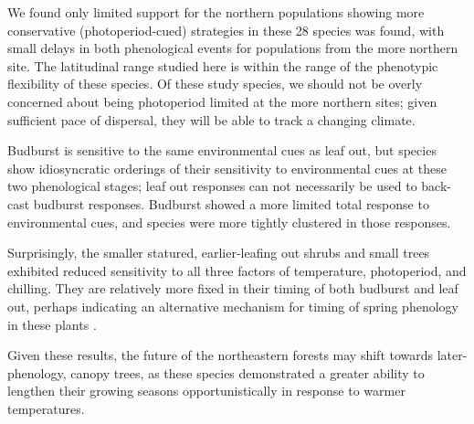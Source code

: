 \documentclass[11pt]{article}
\begin{document}
We found only limited support for the northern populations showing more conservative (photoperiod-cued) strategies in these 28 species was found, with small delays in both phenological events for populations from the more northern site. The latitudinal range studied here is within the range of the phenotypic flexibility of these species. Of these study species, we should not be overly concerned about being photoperiod limited at the more northern sites; given sufficient pace of dispersal, they will be able to track a changing climate.

Budburst is sensitive to the same environmental cues as leaf out, but species show idiosyncratic orderings of their sensitivity to environmental cues at these two phenological stages; leaf out responses can not necessarily be used to back-cast budburst responses. Budburst showed a more limited total response to environmental cues, and species were more tightly clustered in those responses.

Surprisingly, the smaller statured, earlier-leafing out shrubs and small trees exhibited reduced sensitivity to all three factors of temperature, photoperiod, and chilling. They are relatively more fixed in their timing of both budburst and leaf out, perhaps indicating an alternative mechanism for timing of spring phenology in these plants \cite{Pagter:2015}.

Given these results, the future of the northeastern forests may shift towards later-phenology, canopy trees, as these species demonstrated a greater ability to lengthen their growing seasons opportunistically in response to warmer temperatures.

\end{document}
